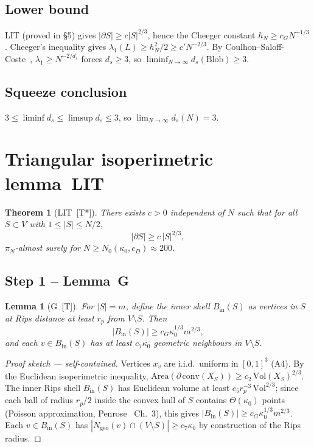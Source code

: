 \documentclass[11pt, a4paper]{article}
\newtheorem{theorem}{Theorem}
\newtheorem{lemma}{Lemma}
\begin{document}
\subsection{Lower bound}
LIT (proved in \S5) gives $|\partial S|\ge c|S|^{2/3}$, hence the
Cheeger constant $h_N\ge c_G N^{-1/3}$.
Cheeger's inequality gives
$\lambda_1(L)\ge h_N^2/2\ge c' N^{-2/3}$.
By Coulhon--Saloff-Coste~\cite{Coulhon1993},
$\lambda_1\ge N^{-2/d_s}$ forces $d_s\ge3$, so
$\liminf_{N\to\infty}d_s(\mathrm{Blob})\ge3$.

\subsection{Squeeze conclusion}
$3\le\liminf d_s\le\limsup d_s\le3$, so
$\lim_{N\to\infty}d_s(N)=3$.

\section{Triangular isoperimetric lemma~LIT}

\begin{theorem}[LIT~{[T*]}]
There exists $c>0$ independent of $N$ such that for all
$S\subset V$ with $1\le|S|\le N/2$,
\[
  |\partial S|\ge c\,|S|^{2/3},
\]
$\pi_N$-almost surely for $N\ge N_0(\kappa_0,c_D)\approx200$.
\end{theorem}

\subsection{Step 1 – Lemma~G}

\begin{lemma}[G~{[T]}]\label{lem:G}
For $|S|=m$, define the inner shell $B_{\mathrm{in}}(S)$ as
vertices in $S$ at Rips distance at least $r_p$ from $V\setminus S$.
Then
\[
  |B_{\mathrm{in}}(S)|\ge c_G\kappa_0^{1/3}m^{2/3},
\]
and each $v\in B_{\mathrm{in}}(S)$ has at least $c_7\kappa_0$
geometric neighbours in $V\setminus S$.
\end{lemma}

\begin{proof}[Proof sketch — self-contained]
Vertices $x_v$ are i.i.d.\ uniform in $[0,1]^3$ (A4).
By the Euclidean isoperimetric inequality,
$\mathrm{Area}(\partial\,\mathrm{conv}(X_S))\ge c_2\,\mathrm{Vol}(X_S)^{2/3}$.
The inner Rips shell $B_{\mathrm{in}}(S)$ has Euclidean volume at
least $c_5 r_p^{-3}\,\mathrm{Vol}^{2/3}$; since each ball of radius
$r_p/2$ inside the convex hull of $S$ contains
$\Theta(\kappa_0)$ points (Poisson approximation, Penrose~\cite{Penrose2003}
Ch.~3), this gives $|B_{\mathrm{in}}(S)|\ge c_G\kappa_0^{1/3}m^{2/3}$.
Each $v\in B_{\mathrm{in}}(S)$ has $|N_{\mathrm{geo}}(v)\cap(V\setminus S)|
\ge c_7\kappa_0$ by construction of the Rips radius.
\end{proof}
\end{document}
